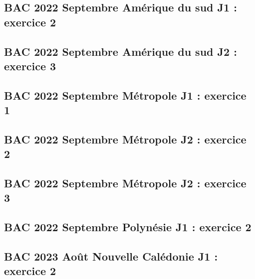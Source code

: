 \documentclass[lang=fr,edition=teacher,layout=sheet]{mxbook}
\begin{document}
\begingroup\endgroup
\par\bigskip
{}\subsection*{BAC 2022 Septembre Amérique du sud J1 : exercice 2}
\begingroup\endgroup
\par\bigskip
{}\subsection*{BAC 2022 Septembre Amérique du sud J2 : exercice 3}
\begingroup\endgroup
\par\bigskip
{}\subsection*{BAC 2022 Septembre Métropole J1 : exercice 1}
\begingroup\endgroup
\par\bigskip
{}\subsection*{BAC 2022 Septembre Métropole J2 : exercice 2}
\begingroup\endgroup
\par\bigskip
{}\subsection*{BAC 2022 Septembre Métropole J2 : exercice 3}
\begingroup\endgroup
\par\bigskip
{}\subsection*{BAC 2022 Septembre Polynésie J1 : exercice 2}
\begingroup\endgroup
\par\bigskip
{}\subsection*{BAC 2023 Août Nouvelle Calédonie J1 : exercice 2}
\end{document}
